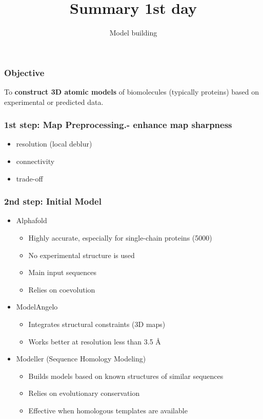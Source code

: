 \documentclass{beamer}
\title{Summary 1st day}
\subtitle{Model building}
\date{}
\begin{document}
\frame{\titlepage}

\begin{frame}
\LARGE
\frametitle{Objective}

To \textbf{construct 3D atomic models} of biomolecules (typically proteins) based on experimental or predicted data.

\end{frame}


\begin{frame}
\LARGE
\frametitle{1st step: Map Preprocessing.-  enhance map sharpness}
    \begin{itemize}
    \item resolution (local deblur)
    \item connectivity
    \item trade-off
\end{itemize}

\end{frame}


\begin{frame}
\LARGE
\frametitle{2nd step: Initial Model}
\begin{itemize}
 \item Alphafold
    \begin{itemize}
    \item Highly accurate, especially for single-chain proteins (5000)
    \item No experimental structure is used
    \item Main input sequences
    \item Relies on coevolution
    \end{itemize}
 \item ModelAngelo
    \begin{itemize}
    \item Integrates structural constraints (3D maps)
    \item Works better at resolution less than 3.5 \AA
    \end{itemize}
 \item  Modeller (Sequence Homology Modeling)
    \begin{itemize}
    \item Builds models based on known structures of similar sequences
    \item Relies on evolutionary conservation
    \item Effective when homologous templates are available
    \end{itemize}
\end{itemize}
\end{frame}
\end{document}
